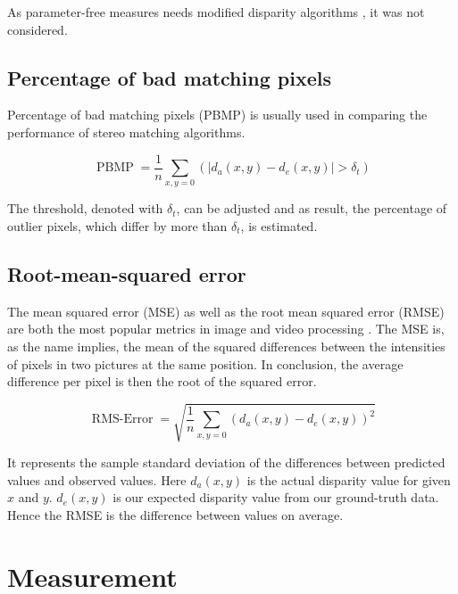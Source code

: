 \noindent As parameter-free measures needs modified disparity algorithms \citep{cyganek2011introduction}, it was not considered.

\subsection*{Percentage of bad matching pixels}

Percentage of bad matching pixels (PBMP) is usually used in comparing the performance of stereo matching algorithms.

\begin{equation}
  \operatorname{PBMP}=\frac{1}{n} \sum_{x,y=0}^{}(|d_a(x,y) - d_e(x,y)| > \delta_t)
\end{equation}

\noindent The threshold, denoted with $\delta_t$, can be adjusted and as result, the percentage of outlier pixels, which differ by more than $\delta_t$, is estimated.

\subsection*{Root-mean-squared error}

The mean squared error (MSE) as well as the root mean squared error (RMSE) are both the most popular metrics in image and video processing \citep{cyganek2011introduction, benoit2008quality, scharstein2002taxonomy}.
The MSE is, as the name implies, the mean of the squared differences between the intensities of pixels in two pictures at the same position.
In conclusion, the average difference per pixel is then the root of the squared error.

\begin{equation}
  \operatorname{RMS-Error}=\sqrt{\frac{1}{n} \sum_{x,y=0}^{}(d_a(x,y) - d_e(x,y))^2}
\end{equation}

\noindent It represents the sample standard deviation of the differences between predicted values and observed values.
Here $d_a(x,y)$ is the actual disparity value for given $x$ and $y$.
$d_e(x,y)$ is our expected disparity value from our ground-truth data.
Hence the RMSE is the difference between values on average.

\section{Measurement}




